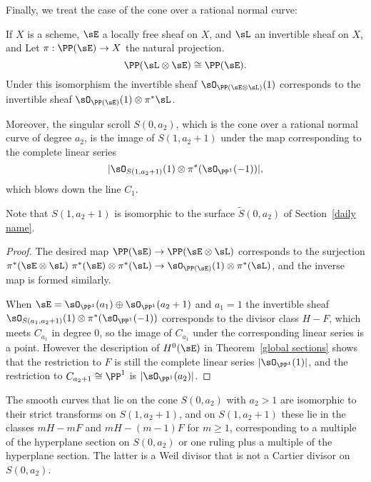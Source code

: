 Finally, we treat the case of the cone over a rational normal curve:
\begin{proposition}\label{singular scrolls}
If $X$ is a scheme, $\sE$ a locally free sheaf on $X$, and $\sL$ an invertible sheaf on $X$, 
and Let $\pi: \PP(\sE)\to X$ the natural projection.
$$
\PP(\sL \otimes \sE)\cong \PP(\sE).
$$
Under this isomorphism the invertible sheaf $\sO_{\PP(\sE\otimes \sL)}(1)$ corresponds to the invertible sheaf
$\sO_{\PP(\sE)}(1)\otimes \pi^{*}\sL$. 

Moreover, the singular scroll $S(0,a_{2})$, which is the cone over a rational normal curve of degree $a_{2}$, is the image of
$S(1, a_{2}+1)$ under the map corresponding to the complete linear series 
$$
|\sO_{S(1, a_{2}+1)}(1) \otimes \pi^{*}(\sO_{\PP^{1}}(-1))|,
$$
which blows down the line $C_{1}$.
\end{proposition}

Note that $S(1,a_2+1)$ is isomorphic to the surface $\tilde S(0, a_2)$ of Section~\ref{daily name}.

\begin{proof} 
The desired map $\PP(\sE) \to \PP(\sE\otimes \sL)$ corresponds to the surjection 
$\pi^*(\sE \otimes\sL) \ \pi^*(\sE) \otimes \pi^*(\sL) \to \sO_{\PP(\sE)}(1) \otimes \pi^*(\sL)$, 
and the inverse map is formed similarly.

When $\sE = \sO_{\PP^1}(a_1)\oplus \sO_{\PP^1}(a_2+1)$ and $a_1 = 1$ the
invertible sheaf
$\sO_{S(a_1, a_{2}+1)}(1) \otimes \pi^{*}(\sO_{\PP^{1}}(-1))$ corresponds to the divisor class $H-F$, which meets $C_{a_1}$  in degree 0, so the image
of $C_{a_1}$ under the corresponding linear series is a point. However the description of  $H^0(\sE)$ in
Theorem~\ref{global sections} shows that the restriction to $F$
is still the complete linear series $|\sO_{\PP^1}(1)|$, and the restriction to $C_{{a_2}+1}\cong \PP^1$
is $|\sO_{\PP^1}(a_2)|$.
\end{proof}

\begin{corollary}\label{curves on a singular scroll}
 The smooth curves that lie on the cone $S(0,a_2)$ with $a_2>1$ are isomorphic to their strict transforms
 on $S(1,a_2+1)$, and on $S(1,a_2+1)$ these lie in the classes $mH-mF$ and $mH-(m-1)F$ for $m\geq 1$, 
 corresponding to a multiple of the hyperplane section on $S(0,a_2)$ or one ruling plus a multiple of the hyperplane section. The latter is a Weil divisor that is not a Cartier divisor on $S(0,a_2)$.
\end{corollary}

